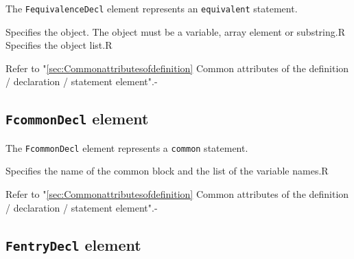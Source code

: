 The {\tt FequivalenceDecl} element represents an {\tt equivalent} statement.


\begin{XcodeMLChildElements}
{Specifies the object. The object must be a variable, array element or substring.}{R}
{Specifies the object list.}{R}
\end{XcodeMLChildElements}

\begin{XcodeMLAttributes}
{Refer to "\ref{sec:Commonattributesofdefinition} Common attributes of the definition / declaration / statement element".}{-}
\end{XcodeMLAttributes}


\subsection{ {\tt FcommonDecl} element}

The {\tt FcommonDecl} element represents a {\tt common} statement.


\begin{XcodeMLChildElements}
{Specifies the name of the common block and the list of the variable names.}{R}
\end{XcodeMLChildElements}

\begin{XcodeMLAttributes}
{Refer to "\ref{sec:Commonattributesofdefinition} Common attributes of the definition / declaration / statement element".}{-}
\end{XcodeMLAttributes}


\subsection{ {\tt FentryDecl} element}

